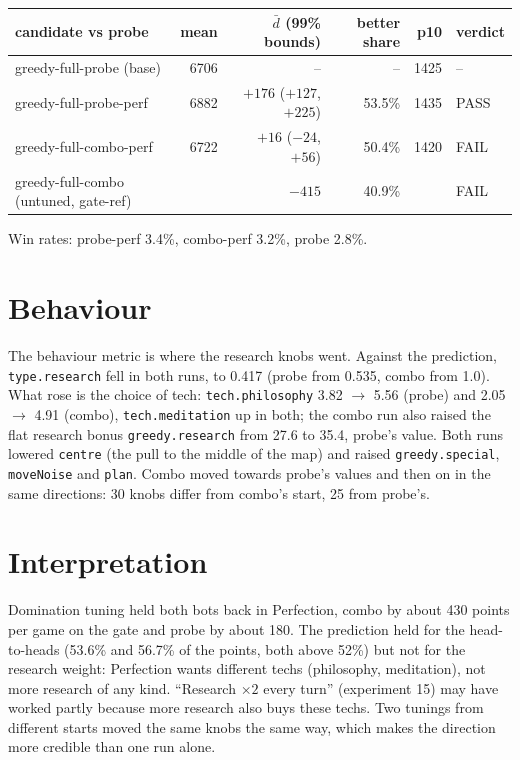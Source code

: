 \documentclass{../polyexp}
\begin{document}
\begin{center}
\begin{tabular}{lrrrrl}
candidate vs probe & mean & $\bar d$ (99\% bounds) & better share & p10 & verdict \\ \hline
greedy-full-probe (base) & 6706 & -- & -- & 1425 & -- \\
greedy-full-probe-perf & 6882 & $+176$ ($+127$, $+225$) & 53.5\% & 1435 & PASS \\
greedy-full-combo-perf & 6722 & $+16$ ($-24$, $+56$) & 50.4\% & 1420 & FAIL \\
greedy-full-combo (untuned, gate-ref) & & $-415$ & 40.9\% & & FAIL \\
\end{tabular}
\end{center}

Win rates: probe-perf 3.4\%, combo-perf 3.2\%, probe 2.8\%.

\section{Behaviour}
The behaviour metric is where the research knobs went. Against the prediction, \texttt{type.research}
fell in both runs, to 0.417 (probe from 0.535, combo from 1.0). What rose is the choice of tech:
\texttt{tech.philosophy} 3.82 $\to$ 5.56 (probe) and 2.05 $\to$ 4.91 (combo), \texttt{tech.meditation} up in
both; the combo run also raised the flat research bonus \texttt{greedy.research} from 27.6 to 35.4,
probe's value. Both runs lowered \texttt{centre} (the pull to the middle of the map) and raised
\texttt{greedy.special}, \texttt{moveNoise} and \texttt{plan}. Combo moved towards probe's values and then on in the
same directions: 30 knobs differ from combo's start, 25 from probe's.

\section{Interpretation}
Domination tuning held both bots back in Perfection, combo by about 430 points per game on the gate
and probe by about 180. The prediction held for the head-to-heads (53.6\% and 56.7\% of the points, both
above 52\%) but not for the research weight: Perfection wants different techs (philosophy, meditation),
not more research of any kind. ``Research $\times2$ every turn'' (experiment 15) may have worked partly
because more research also buys these techs. Two tunings from different starts moved the same knobs the
same way, which makes the direction more credible than one run alone.
\end{document}
